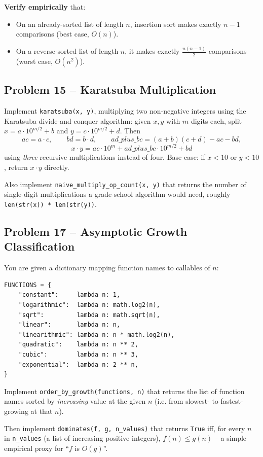 \documentclass[11pt]{article}
\begin{document}
\textbf{Verify empirically} that:
\begin{itemize}
    \item On an already-sorted list of length $n$, insertion sort makes exactly $n-1$
    comparisons (best case, $O(n)$).
    \item On a reverse-sorted list of length $n$, it makes exactly $\frac{n(n-1)}{2}$
    comparisons (worst case, $O(n^2)$).
\end{itemize}

\subsection*{Problem 15 -- Karatsuba Multiplication}

Implement \texttt{karatsuba(x, y)}, multiplying two non-negative integers using the
Karatsuba divide-and-conquer algorithm: given $x, y$ with $m$ digits each, split
$x = a\cdot 10^{m/2} + b$ and $y = c\cdot 10^{m/2} + d$. Then
\[
  ac = a \cdot c, \qquad bd = b \cdot d, \qquad
  ad\_plus\_bc = (a+b)(c+d) - ac - bd,
\]
\[
  x \cdot y = ac \cdot 10^{m} + ad\_plus\_bc \cdot 10^{m/2} + bd
\]
using \emph{three} recursive multiplications instead of four. Base case: if $x < 10$ or
$y < 10$, return $x \cdot y$ directly.

Also implement \texttt{naive\_multiply\_op\_count(x, y)} that returns the number of
single-digit multiplications a grade-school algorithm would need, roughly
\texttt{len(str(x)) * len(str(y))}.

\subsection*{Problem 17 -- Asymptotic Growth Classification}

You are given a dictionary mapping function names to callables of $n$:
\begin{verbatim}
FUNCTIONS = {
    "constant":     lambda n: 1,
    "logarithmic":  lambda n: math.log2(n),
    "sqrt":         lambda n: math.sqrt(n),
    "linear":       lambda n: n,
    "linearithmic": lambda n: n * math.log2(n),
    "quadratic":    lambda n: n ** 2,
    "cubic":        lambda n: n ** 3,
    "exponential":  lambda n: 2 ** n,
}
\end{verbatim}
Implement \texttt{order\_by\_growth(functions, n)} that returns the list of function names
sorted by \emph{increasing} value at the given $n$ (i.e. from slowest- to
fastest-growing at that $n$).

Then implement \texttt{dominates(f, g, n\_values)} that returns \texttt{True} iff, for
every $n$ in \texttt{n\_values} (a list of increasing positive integers),
$f(n) \le g(n)$ -- a simple empirical proxy for ``$f$ is $O(g)$''.
\end{document}
